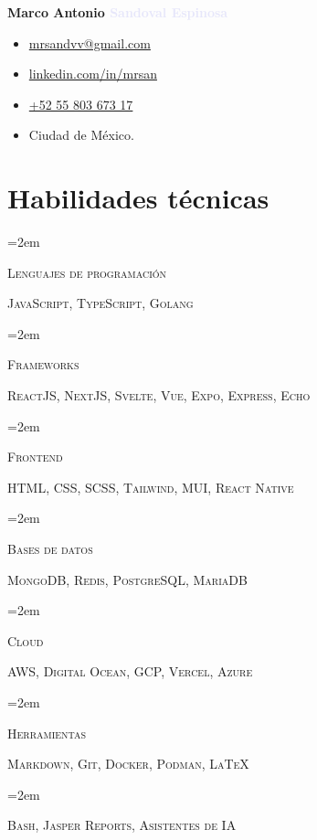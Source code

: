 \documentclass[letterpaper]{article}
\newlength{\spacebox}
\newcommand{\skill}[2]{
\noindent\hangindent=2em\hangafter=0
\parbox{3\spacebox}{
\textsc{#1}}
#2 \par
\vspace{0.5em}
}
\begin{document}
\thispagestyle{empty}
\noindent
\textbf{\Huge \textcolor{darklavender}{Marco Antonio} \textcolor{lavender}{Sandoval Espinosa}}\par

\begin{flushleft}

\end{flushleft}\par

\noindent
\begin{itemize}[itemsep=0em]
\item[\faAt] \href{mailto:mrsandvv@gmail.com}{mrsandvv@gmail.com}
\item[\faLinkedin]\href{https://linkedin.com/in/mrsan}{linkedin.com/in/mrsan}
\item[\faPhone] \href{tel:+525580367317}{+52 55 803 673 17}
\item[\faMapMarker] \textcolor{darklavender}{Ciudad de México.}
\end{itemize}

\section*{Habilidades técnicas}
\skill{Lenguajes de programación}{\textsc{JavaScript},  \textsc{TypeScript},  \textsc{Golang} }
\skill{Frameworks}{\textsc{ReactJS, NextJS, Svelte, Vue, Expo, Express, Echo}}
\skill{Frontend}{\textsc{HTML, CSS, SCSS, Tailwind, MUI, React Native}}
\skill{Bases de datos}{\textsc{MongoDB, Redis, PostgreSQL, MariaDB}}
\skill{Cloud}{\textsc{AWS, Digital Ocean, GCP, Vercel, Azure}}
\skill{Herramientas}{\textsc{Markdown, Git, Docker, Podman, \LaTeX}}
\skill{ }{\textsc{Bash, Jasper Reports, Asistentes de IA}}
\end{document}
